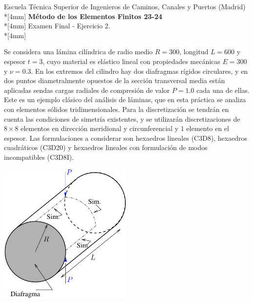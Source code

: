 \documentclass[a4paper,12pt]{article}
\begin{document}
\def\bm#1{{\mbox{\boldmath $#1$}}}
\def\eqdef{\buildrel \rm def \over =}
\def\signo{\mathop{\rm signo}\nolimits}

\mbox{}\vspace*{-20mm}

{\centering
{\small\sc Escuela Técnica Superior de Ingenieros de Caminos, Canales y Puertos (Madrid)}\\*[4mm]
{\Large\bf Método de los Elementos Finitos 23-24}\\*[4mm]
Examen Final - Ejercicio 2. \\*[4mm]
}


\noindent
Se considera una lámina cilíndrica de radio medio $R=300$,
longitud $L=600$ y espesor $t=3$, cuyo material es elástico lineal con
propiedades mecánicas $E=300$ y $\nu=0.3$. En los extremos del cilindro hay
dos diafragmas rígidos circulares, y en dos puntos diametralmente
opuestos de la sección transversal media están aplicadas sendas cargas radiales
de compresión de valor $P=1.0$ cada una de ellas. Este es un ejemplo clásico
del análisis de láminas, que en esta práctica se analiza con elementos sólidos
tridimensionales. Para la discretización se tendrán en cuenta las condiciones de
simetría existentes, y se utilizarán discretizaciones de $8 \times 8$ elementos en dirección
meridional y circunferencial y $1$ elemento en el espesor. Las formulaciones a considerar son hexaedros lineales (C3D8), hexaedros cuadráticos (C3D20) y hexaedros lineales con formulación de modos incompatibles (C3D8I).

\vspace{5mm}
\begin{center}
\includegraphics[width=0.50\textwidth]{pinched}
\end{center}
\end{document}
